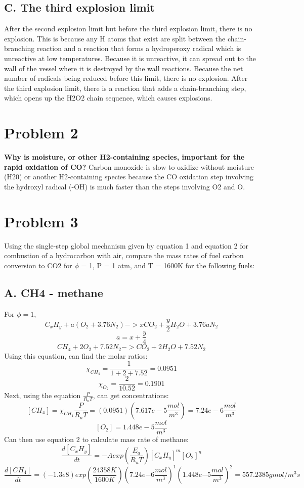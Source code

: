 \documentclass{article}
\begin{document}
\subsection*{C. The third explosion limit}
\indent After the second explosion limit but before the third explosion limit, there is no explosion.  This is because any H atoms that exist are split between the chain-branching reaction and a reaction that forms a hydroperoxy radical which is unreactive at low temperatures.  Because it is unreactive, it can spread out to the wall of the vessel where it is destroyed by the wall reactions.  Because the net number of radicals being reduced before this limit, there is no explosion. \newline
\indent After the third explosion limit, there is a reaction that adds a chain-branching step, which opens up the H2O2 chain sequence, which causes explosions. 

\section*{Problem 2}
\textbf{Why is moisture, or other H2-containing species, important for the rapid oxidation of CO?} \newline
\indent Carbon monoxide is slow to oxidize without moisture (H20) or another H2-containing species because the CO oxidation step involving the hydroxyl radical (-OH) is much faster than the steps involving O2 and O.

\section*{Problem 3}
Using the single-step global mechanism given by equation 1 and equation 2 for combustion of a hydrocarbon with air, compare the mass rates of fuel carbon conversion to CO2 for $\phi$ = 1, P = 1 atm, and T = 1600K for the following fuels:

\subsection*{A. CH4 - methane}
For $\phi=1$,
$$C_xH_y+a(O_2+3.76N_2) -> xCO_2+\frac{y}{2}H_2O+3.76aN_2$$
$$a=x+\frac{y}{4}$$
$$CH_4+2O_2+7.52N_2 -> CO_2+2H_2O+7.52N_2$$
Using this equation, can find the molar ratios:
$$\chi_{CH_4}=\frac{1}{1+2+7.52}=0.0951$$
$$\chi_{O_2}=\frac{2}{10.52}=0.1901$$
Next, using the equation $\frac{P}{R_uT}$, can get concentrations:
$$[CH_4]=\chi_{CH_4}\frac{P}{R_uT}=(0.0951)(7.617e-5\frac{mol}{m^3})=7.24e-6\frac{mol}{m^3}$$
$$[O_2]=1.448e-5\frac{mol}{m^3}$$
Can then use equation 2 to calculate mass rate of methane:
$$\frac{d[C_xH_y]}{dt}=-Aexp(\frac{E_a}{R_uT})[C_xH_y]^m[O_2]^n$$
$$\frac{d[CH_4]}{dt}=(-1.3e8)exp(\frac{24358K}{1600K})(7.24e{-6}\frac{mol}{m^3})^1(1.448e{-5}\frac{mol}{m^3})^2=557.2385gmol/m^3s$$
\end{document}
